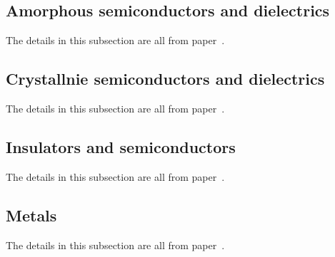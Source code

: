 \documentclass[pra,superscriptaddress,reprint]{revtex4-1}
\begin{document}
\subsection{Amorphous semiconductors and dielectrics}
The details in this subsection are all from paper~\cite{forouhi1986optical}.


\subsection{Crystallnie semiconductors and dielectrics}
The details in this subsection are all from paper~\cite{forouhi1988optical}.


\subsection{Insulators and semiconductors}
The details in this subsection are all from paper~\cite{forouhi2019new}.


\subsection{Metals}
The details in this subsection are all from paper~\cite{forouhi2021optical}.






\appendix
\end{document}

